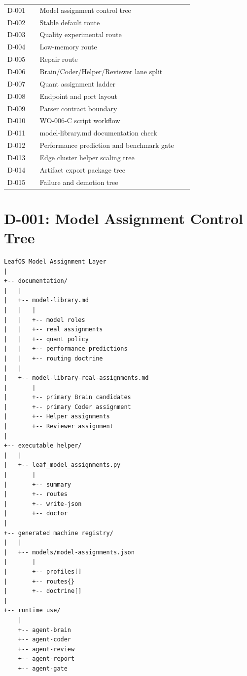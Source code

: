 \documentclass[11pt]{article}
\begin{document}
\begin{longtable}{>{\ttfamily}p{0.16\linewidth} p{0.76\linewidth}}
D-001 & Model assignment control tree \\
D-002 & Stable default route \\
D-003 & Quality experimental route \\
D-004 & Low-memory route \\
D-005 & Repair route \\
D-006 & Brain/Coder/Helper/Reviewer lane split \\
D-007 & Quant assignment ladder \\
D-008 & Endpoint and port layout \\
D-009 & Parser contract boundary \\
D-010 & WO-006-C script workflow \\
D-011 & model-library.md documentation check \\
D-012 & Performance prediction and benchmark gate \\
D-013 & Edge cluster helper scaling tree \\
D-014 & Artifact export package tree \\
D-015 & Failure and demotion tree \\
\end{longtable}

\newpage

\section{D-001: Model Assignment Control Tree}

\begin{Verbatim}[fontsize=\scriptsize, frame=single]
LeafOS Model Assignment Layer
|
+-- documentation/
|   |
|   +-- model-library.md
|   |   |
|   |   +-- model roles
|   |   +-- real assignments
|   |   +-- quant policy
|   |   +-- performance predictions
|   |   +-- routing doctrine
|   |
|   +-- model-library-real-assignments.md
|       |
|       +-- primary Brain candidates
|       +-- primary Coder assignment
|       +-- Helper assignments
|       +-- Reviewer assignment
|
+-- executable helper/
|   |
|   +-- leaf_model_assignments.py
|       |
|       +-- summary
|       +-- routes
|       +-- write-json
|       +-- doctor
|
+-- generated machine registry/
|   |
|   +-- models/model-assignments.json
|       |
|       +-- profiles[]
|       +-- routes{}
|       +-- doctrine[]
|
+-- runtime use/
    |
    +-- agent-brain
    +-- agent-coder
    +-- agent-review
    +-- agent-report
    +-- agent-gate
\end{Verbatim}
\end{document}
